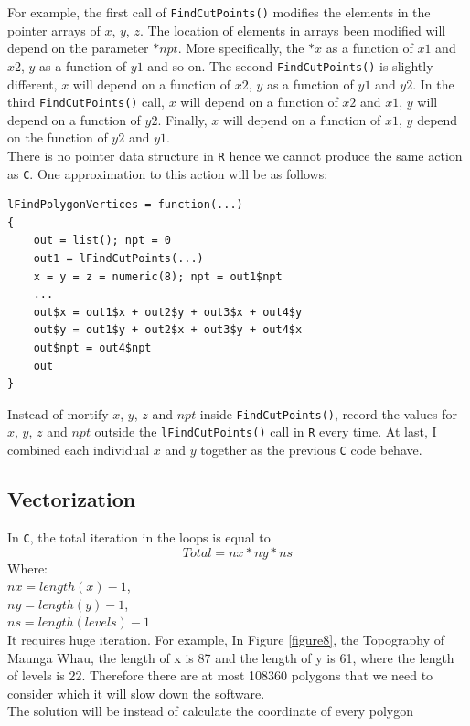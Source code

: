 \documentclass[paper=a4, fontsize=11pt]{report}
\begin{document}
For example, the first call of \texttt{FindCutPoints()} modifies the elements in the pointer arrays of $x$, $y$, $z$. The location of elements in arrays been modified will depend on the parameter $*npt$. More specifically, the $*x$ as a function of $x1$ and $x2$, $y$ as a function of $y1$ and so on. The second \texttt{FindCutPoints()} is slightly different, $x$ will depend on a function of $x2$, $y$ as a function of $y1$ and $y2$. In the third \texttt{FindCutPoints()} call, $x$ will depend on a function of $x2$ and $x1$, $y$ will depend on a function of $y2$. Finally, $x$ will depend on a function of $x1$, $y$ depend on the function of $y2$ and $y1$. \\

There is no pointer data structure in \texttt{R} hence we cannot produce the same action as \texttt{C}. One approximation to this action will be as follows:
\begin{lstlisting}
lFindPolygonVertices = function(...)
{
    out = list(); npt = 0
    out1 = lFindCutPoints(...)
    x = y = z = numeric(8); npt = out1$npt
    ...
    out$x = out1$x + out2$y + out3$x + out4$y
    out$y = out1$y + out2$x + out3$y + out4$x
    out$npt = out4$npt
    out
}
\end{lstlisting}
Instead of mortify $x$, $y$, $z$ and $npt$ inside \texttt{FindCutPoints()}, record the values for $x$, $y$, $z$ and $npt$ outside the \texttt{lFindCutPoints()} call in \texttt{R} every time. At last, I combined each individual $x$ and $y$ together as the previous \texttt{C} code behave. 


\subsection{Vectorization}
In \texttt{C}, the total iteration in the loops is equal to
\begin{equation}
Total = nx * ny * ns
\end{equation}
Where:\\
$nx = length(x) - 1$,\\
$ny = length(y) - 1$,\\
$ns = length(levels) - 1$\\
It requires huge iteration. For example, In Figure \ref{figure8}, the Topography of Maunga Whau, the length of x is 87 and the length of y is 61, where the length of levels is 22. Therefore there are at most 108360 polygons that we need to consider which it will slow down the software. \\
The solution will be instead of calculate the coordinate of every polygon 
\end{document}
